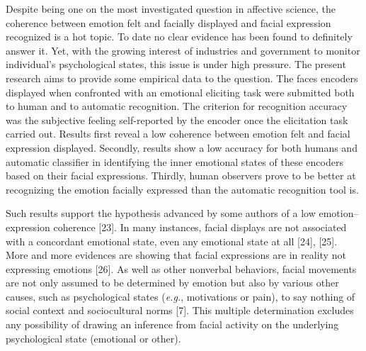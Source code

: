 \documentclass[conference,final,]{IEEEtran}
\begin{document}
Despite being one on the most investigated question in affective
science, the coherence between emotion felt and facially displayed and
facial expression recognized is a hot topic. To date no clear evidence
has been found to definitely answer it. Yet, with the growing interest
of industries and government to monitor individual's psychological
states, this issue is under high pressure. The present research aims to
provide some empirical data to the question. The faces encoders
displayed when confronted with an emotional eliciting task were
submitted both to human and to automatic recognition. The criterion for
recognition accuracy was the subjective feeling self-reported by the
encoder once the elicitation task carried out. Results first reveal a
low coherence between emotion felt and facial expression displayed.
Secondly, results show a low accuracy for both humans and automatic
classifier in identifying the inner emotional states of these encoders
based on their facial expressions. Thirdly, human observers prove to be
better at recognizing the emotion facially expressed than the automatic
recognition tool is.

Such results support the hypothesis advanced by some authors of a low
emotion--expression coherence {[}23{]}. In many instances, facial
displays are not associated with a concordant emotional state, even any
emotional state at all {[}24{]}, {[}25{]}. More and more evidences are
showing that facial expressions are in reality not expressing emotions
{[}26{]}. As well as other nonverbal behaviors, facial movements are not
only assumed to be determined by emotion but also by various other
causes, such as psychological states (\emph{e.g.},
\nolinebreak motivations or pain), to say nothing of social context and
sociocultural norms {[}7{]}. This multiple determination excludes any
possibility of drawing an inference from facial activity on the
underlying psychological state (emotional or other).
\end{document}
